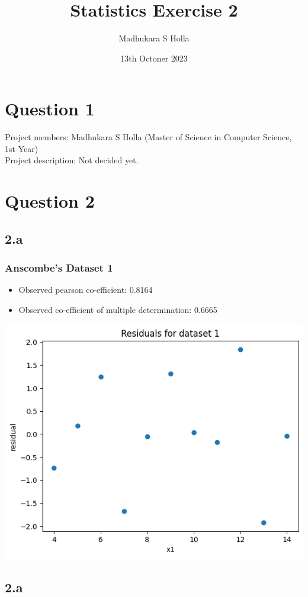 \documentclass[12pt]{article}
\author{Madhukara S Holla}
\title{Statistics Exercise 2}
\date{13th Octoner 2023}
\begin{document}
\maketitle
\newpage
\section*{Question 1}
Project members: Madhukara S Holla (Master of Science in Computer Science, 1st Year)
\\
Project description: Not decided yet.

\newpage
\section*{Question 2}
\subsection*{2.a}
\subsubsection*{Anscombe's Dataset 1}
\begin{itemize}
    \item Observed pearson co-efficient: 0.8164
    \item Observed co-efficient of multiple determination: 0.6665
\end{itemize}
\includegraphics*[width=\linewidth]{graph2a1}

\newpage
\subsection*{2.a}
\end{document}

